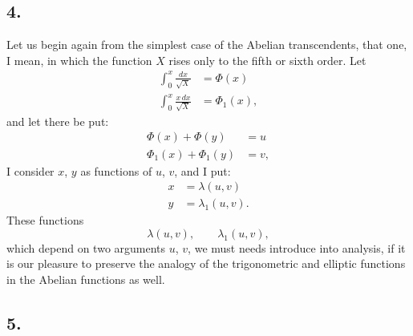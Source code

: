 \documentclass{article}
\begin{document}
\subsection*{4.}

Let us begin again from the simplest case of the Abelian transcendents, that one, I mean, in which the function $X$ rises only to the fifth or sixth order. Let
\[ \begin{aligned} \int_0^{x} \frac{dx}{\sqrt{X}} &= \Phi(x) \\ \int_0^{x} \frac{x\,dx}{\sqrt{X}} &= \Phi_1(x), \end{aligned} \]
and let there be put:
\[ \begin{aligned} \Phi(x) + \Phi(y) &= u \\ \Phi_1(x) + \Phi_1(y) &= v, \end{aligned} \]
I consider $x$, $y$ as functions of $u$, $v$, and I put:
\[ \begin{aligned} x &= \lambda(u,v) \\ y &= \lambda_1(u,v). \end{aligned} \]
These functions
\[ \lambda(u,v), \qquad \lambda_1(u,v), \]
which depend on two arguments $u$, $v$, we must needs introduce into analysis, if it is our pleasure to preserve the analogy of the trigonometric and elliptic functions in the Abelian functions as well.

\subsection*{5.}
\end{document}
